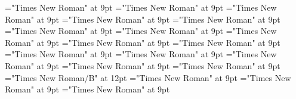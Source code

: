 \documentclass[gps1,twoside]{article}
\begin{document}
\font\usageusageusagessensesensessensesensessubentrysubentriesentrybefore="Times New Roman" at 9pt
\font\usagessensesensessensesensessubentrysubentriesentrybefore="Times New Roman" at 9pt
\font\usagessensesensessensesensessubentrysubentriesentryafter="Times New Roman" at 9pt
\font\spanspanabbreviationusageusagessensesensessensesensessubentrysubentriesentrybefore="Times New Roman" at 9pt
\font\visiblecomplexformbackrefvisiblecomplexformbackrefvisiblecomplexformbackrefssensesensessensesensessubentrysubentriesentrybefore="Times New Roman" at 9pt
\font\visiblecomplexformbackrefssensesensessensesensessubentrysubentriesentryafter="Times New Roman" at 9pt
\font\complexformtypesvisiblecomplexformbackrefvisiblecomplexformbackrefssensesensessensesensessubentrysubentriesentryafter="Times New Roman" at 9pt
\font\spanspanreverseabbrcomplexformtypecomplexformtypesvisiblecomplexformbackrefvisiblecomplexformbackrefssensesensessensesensessubentrysubentriesentrybefore="Times New Roman" at 9pt
\font\spanspanheadwordvisiblecomplexformbackrefvisiblecomplexformbackrefssensesensessensesensessubentrysubentriesentrybefore="Times New Roman" at 9pt
\font\spanspanowningentrysummarydefinitionvisiblecomplexformbackrefvisiblecomplexformbackrefssensesensessensesensessubentrysubentriesentrybefore="Times New Roman" at 9pt
\font\spanowningentrysummarydefinitionvisiblecomplexformbackrefvisiblecomplexformbackrefssensesensessensesensessubentrysubentriesentryfirstchildbefore="Times New Roman" at 9pt
\font\spanowningentrysummarydefinitionvisiblecomplexformbackrefvisiblecomplexformbackrefssensesensessensesensessubentrysubentriesentrylastchildafter="Times New Roman" at 9pt
\font\nontrivialentryrootnontrivialentryrootnontrivialentryrootsvisiblecomplexformbackrefvisiblecomplexformbackrefssensesensessensesensessubentrysubentriesentrybefore="Times New Roman" at 9pt
\font\nontrivialentryrootsvisiblecomplexformbackrefvisiblecomplexformbackrefssensesensessensesensessubentrysubentriesentrybefore="Times New Roman" at 9pt
\font\nontrivialentryrootsvisiblecomplexformbackrefvisiblecomplexformbackrefssensesensessensesensessubentrysubentriesentryafter="Times New Roman" at 9pt
\font\nontrivialentryrootnontrivialentryrootsvisiblecomplexformbackrefvisiblecomplexformbackrefssensesensessensesensessubentrysubentriesentry="Times New Roman/B" at 12pt
\font\complexformsnotsubentrycomplexformsnotsubentrycomplexformsnotsubentriessubentrysubentriesentrybefore="Times New Roman" at 9pt
\font\complexformsnotsubentriessubentrysubentriesentryafter="Times New Roman" at 9pt
\font\complexformtypescomplexformsnotsubentrycomplexformsnotsubentriessubentrysubentriesentryafter="Times New Roman" at 9pt
\end{document}
